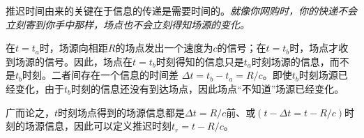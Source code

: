 推迟时间由来的关键在于信息的传递是需要时间的。\textsl{就像你网购时，你的快递不会立刻寄到你手中那样，场点也不会立刻得知场源的变化。}

在$t=t_a$时，场源向相距$R$的场点发出一个速度为$c$的信号；在$t=t_b$时，场点才收到场源的信号。因此，场点在$t=t_b$时刻得知的信息只是$t_a$时刻场源的信息，而不是$t_b$时刻。二者间存在一个信息的时间差 $\Delta t= t_b-t_a = R/c $。即使$t_b$时刻场源已经变化，由于$t_b$时刻的信息还没有到达场点，因此场点“不知道”场源已经变化。

广而论之，$t$时刻场点得到的场源信息都是$\Delta t = R/c$前、或$(t-\Delta t = t-R/c)$时刻的场源信息，因此可以定义推迟时刻$t_r=t-R/c$。
